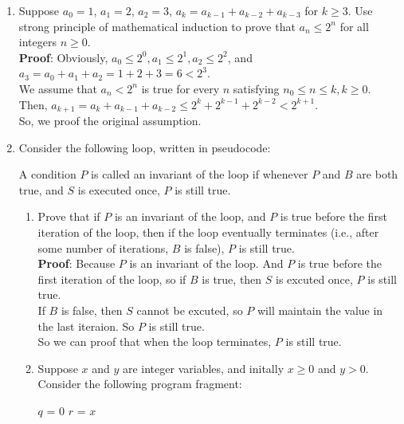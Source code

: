 \documentclass[12pt,a4paper]{article}
\theoremstyle{definition}
\numberwithin{equation}{section}
\numberwithin{figure}{section}
\begin{document}
\begin{enumerate}
\item Suppose $a_0=1$, $a_1=2$, $a_2=3$, $a_k=a_{k-1}+a_{k-2}+a_{k-3}$ for $k \ge 3$. Use strong principle of mathematical induction to prove that $a_n \le 2^n$ for all integers $n\ge 0$.\\
\textbf{Proof}: Obviously, $a_0 \leq 2^0, a_1 \leq 2^1, a_2 \leq 2^2$, and  $a_3=a_0+a_1+a_2=1+2+3=6<2^3$.\\
We assume that $a_n<2^n$ is true for every $n$ satisfying $n_0 \leq n \leq k, k \geq 0$.\\
Then, $a_{k+1}=a_{k}+a_{k-1}+a_{k-2} \leq 2^k+2^{k-1}+2^{k-2} <2^{k+1}$.\\
So, we proof the original assumption.


\item Consider the following loop, written in pseudocode:

\begin{center}
\begin{minipage}[b]{0.2\textwidth}
\begin{algorithm}[H]
\end{algorithm}
\end{minipage}
\end{center}
A condition $P$ is called an invariant of the loop if whenever $P$ and $B$ are both true, and $S$ is executed once, $P$ is still true.

\begin{enumerate}
  \item Prove that if $P$ is an invariant of the loop, and $P$ is true before the first iteration of the loop, then if the loop eventually terminates (i.e., after some number of iterations, $B$ is false), $P$ is still true.\\
  \textbf{Proof}: Because $P$ is an invariant of the loop. And $P$ is true before the first iteration of the loop, so if $B$ is true, then $S$ is excuted once, $P$ is still true.
  \\If $B$ is false, then $S$ cannot be excuted, so $P$ will maintain the value in the last iteraion. So $P$ is still true.
  \\So we can proof that when the loop terminates, $P$ is still true. 
  \item Suppose $x$ and $y$ are integer variables, and initally $x\ge 0$ and $y > 0$. Consider the following program fragment:

\begin{center}
\begin{minipage}[b]{0.25\textwidth}
\begin{algorithm}[H]
   $q$ = 0\;
   $r$ = $x$\;
\end{algorithm}
\end{minipage}
\end{center}


\end{enumerate}
\end{enumerate}
\end{document}
